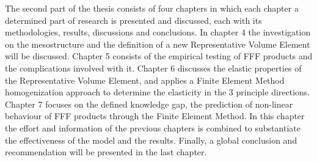 The second part of the thesis consists of four chapters in which each chapter a determined part of research is presented and discussed, each with its methodologies, results, discussions and conclusions. In chapter 4 the investigation on the mesostructure and the definition of a new Representative Volume Element will be discussed. Chapter 5 consists of the empirical testing of FFF products and the complications involved with it. Chapter 6 discusses the elastic properties of the Representative Volume Element, and applies a Finite Element Method homogenization approach to determine the elasticity in the 3 principle directions. Chapter 7 focuses on the defined knowledge gap, the prediction of non-linear behaviour of FFF products through the Finite Element Method. In this chapter the effort and information of the previous chapters is combined to substantiate the effectiveness of the model and  the results. 
Finally, a global conclusion and recommendation will be presented in the last chapter. 










